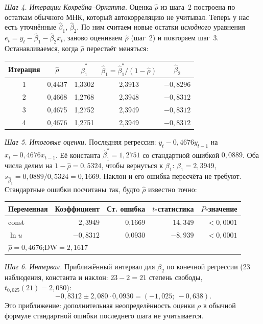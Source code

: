 \begin{solution}
\smallskip
\emph{Шаг 4. Итерации Кохрейна--Оркатта.} Оценка $\widehat\rho$ из шага~2
построена по остаткам обычного МНК, который автокорреляцию не учитывал.
Теперь у нас есть уточнённые $\widehat\beta_1$, $\widehat\beta_2$. По ним
считаем новые остатки \emph{исходного} уравнения
$e_t = y_t - \widehat\beta_1 - \widehat\beta_2x_t$, заново оцениваем
$\widehat\rho$ (шаг~2) и повторяем шаг~3. Останавливаемся, когда
$\widehat\rho$ перестаёт меняться:
\begin{center}
\begin{tabular}{ccccc}
\toprule
Итерация & $\widehat\rho$ & $\widehat\beta_1^*$ & $\widehat\beta_1 = \widehat\beta_1^*/(1-\widehat\rho)$ & $\widehat\beta_2$ \\
\midrule
1 & 0,4437 & 1,3302 & 2,3913 & $-0{,}8296$ \\
2 & 0,4668 & 1,2768 & 2,3948 & $-0{,}8312$ \\
3 & 0,4675 & 1,2752 & 2,3949 & $-0{,}8312$ \\
4 & 0,4676 & 1,2751 & 2,3949 & $-0{,}8312$ \\
\bottomrule
\end{tabular}
\end{center}

\smallskip
\emph{Шаг 5. Итоговые оценки.} Последняя регрессия:
$y_t - 0{,}4676y_{t-1}$ на $x_t - 0{,}4676x_{t-1}$. Её константа
$\widehat\beta_1^* = 1{,}2751$ со стандартной ошибкой $0{,}0889$. Оба числа
делим на $1 - \widehat\rho = 0{,}5324$, чтобы вернуться к $\beta_1$:
$\widehat\beta_1 = 2{,}3949$, $s_{\widehat\beta_1} = 0{,}0889/0{,}5324 =
0{,}1669$. Наклон и его ошибка пересчёта не требуют. Стандартные ошибки
посчитаны так, будто $\widehat\rho$ известно точно:
\begin{center}
\begin{tabular}{lrrrr}
\toprule
Переменная & Коэффициент & Ст. ошибка & $t$-статистика & $P$-значение \\
\midrule
const   & $\phantom{-}2{,}3949$ & 0,1669 & $14{,}349$ & $<0{,}0001$ \\
$\ln u$ & $-0{,}8312$ & 0,0930 & $-8{,}939$ & $<0{,}0001$ \\
\midrule
\multicolumn{5}{l}{$\widehat\rho=0{,}4676$;\quad $\mathrm{DW} = 2{,}1617$} \\
\bottomrule
\end{tabular}
\end{center}

\noindent\begin{minipage}{\linewidth}
\emph{Шаг 6. Интервал.} Приближённый интервал для $\beta_2$ по конечной регрессии
(23 наблюдения, константа и наклон: $23-2=21$ степень свободы,
$t_{0{,}025}(21)=2{,}080$):
\[
  -0{,}8312 \pm 2{,}080\cdot 0{,}0930 = (-1{,}025;\ -0{,}638).
\]
Это приближение: дополнительная неопределённость оценки $\rho$
в обычной формуле стандартной ошибки последнего шага не учитывается.
\end{minipage}


\end{solution}
